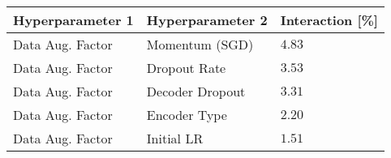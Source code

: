\begin{tabular}{lll}
\toprule
Hyperparameter 1 & Hyperparameter 2 & Interaction [\%] \\
\midrule
Data Aug. Factor & Momentum (SGD) & $4.83$ \\
Data Aug. Factor & Dropout Rate & $3.53$ \\
Data Aug. Factor & Decoder Dropout & $3.31$ \\
Data Aug. Factor & Encoder Type & $2.20$ \\
Data Aug. Factor & Initial LR & $1.51$ \\
\bottomrule
\end{tabular}
